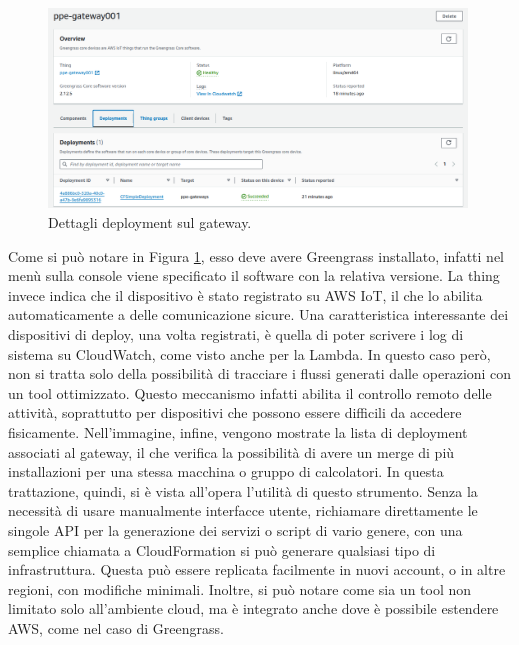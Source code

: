 \begin{figure}[htbp]
    \centering
    \includegraphics[width=0.99\textwidth]{figures/gateway-specs.png}
    \caption{Dettagli deployment sul gateway.} 
    \label{fig:gateway-specs}
\end{figure}

Come si può notare in Figura \ref{fig:gateway-specs}, esso deve avere Greengrass installato, infatti nel menù sulla console viene specificato il software con la relativa versione. La thing invece indica che il dispositivo è stato registrato su AWS IoT, il che lo abilita automaticamente a delle comunicazione sicure. Una caratteristica interessante dei dispositivi di deploy, una volta registrati, è quella di poter scrivere i log di sistema su CloudWatch, come visto anche per la Lambda. In questo caso però, non si tratta solo della possibilità di tracciare i flussi generati dalle operazioni con un tool ottimizzato. Questo meccanismo infatti abilita il controllo remoto delle attività, soprattutto per dispositivi che possono essere difficili da accedere fisicamente. Nell'immagine, infine, vengono mostrate la lista di deployment associati al gateway, il che verifica la possibilità di avere un merge di più installazioni per una stessa macchina o gruppo di calcolatori. In questa trattazione, quindi, si è vista all'opera l'utilità di questo strumento. Senza la necessità di usare manualmente interfacce utente, richiamare direttamente le singole API per la generazione dei servizi o script di vario genere, con una semplice chiamata a CloudFormation si può generare qualsiasi tipo di infrastruttura. Questa può essere replicata facilmente in nuovi account, o in altre regioni, con modifiche minimali. Inoltre, si può notare come sia un tool non limitato solo all'ambiente cloud, ma è integrato anche dove è possibile estendere AWS, come nel caso di Greengrass.  

  
